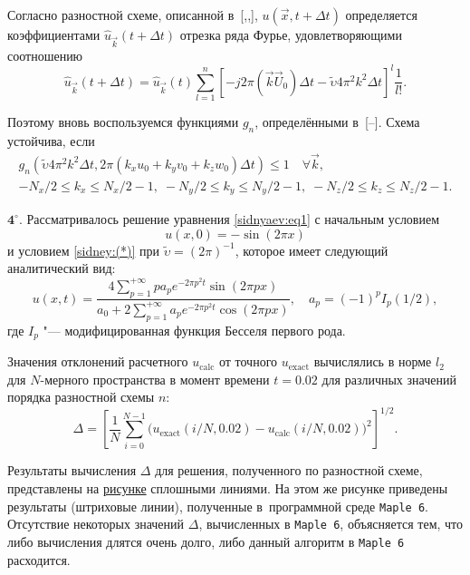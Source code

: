 Согласно разностной схеме, описанной в~[,,], $u ( \vec{x},t+\Delta t)$ определяется коэффициентами
$\hat{u}_{\vec {k}} (t+\Delta t)$ отрезка ряда Фурье, удовлетворяющими соотношению
\[
\hat{u}_{\vec {k}} (t+\Delta t)=\hat{u} _{\vec {k}} ( t )\sum\limits_{l=1}^n \left[-j 2\pi
(\vec {k}\vec {U}_0)\Delta t-  \tilde{\upsilon}  4 \pi^2 k^2\Delta t \right]^l \frac{1}{l!}.
\]

Поэтому вновь воспользуемся функциями $g_n$, определёнными в~[--]. 
Схема устойчива, если 
\begin{gather*}
g_n \left(   \tilde{\upsilon}  4\pi ^2k^2\Delta t, 2\pi (k_x u_0 +k_y v_0
+k_z w_0)\Delta t \right)\le 1 \quad \forall \vec {k},\\
-{N_x }/{2}\le k_x \le {N_x }/{2}-1,\;
-{N_y }/{2}\le k_y \le {N_y }/{2}-1,\;
-{N_z }/{2}\le k_z \le {N_z }/{2}-1.
\end{gather*}

\smallskip

{$\mathbf 4^\circ.$} 
Рассматривалось  решение уравнения \eqref{sidnyaev:eq1} с начальным условием
\begin{equation}
\label{sidnay(***)}
u (x, 0)=-\sin (2\pi x)
\end{equation} 
и условием \eqref{sidney:(*)} при $  \tilde{\upsilon}  = (2 \pi)^{-1}$, которое имеет следующий аналитический вид:
\[
u(x,t)=\frac{4\sum_{p=1}^{+\infty } pa_p e^{-2 \pi p^2 t} \sin (2\pi p x )}
{a_0 +2 \sum _{p=1}^{+\infty} a_p e^{-2 \pi p^2t } \cos (2\pi p x)}, 
\quad
a_p =(-1)^p I_p (1/2),
\]
где
$I_p$ "--- модифицированная функция Бесселя первого рода.

Значения отклонений расчетного $u_{\text{calc}}$ от точного $u_{\text{exact}}
$ вычислялись в норме $l_2$ для $N$-мерного пространства в момент времени
$t=0.02$ для различных значений порядка разностной схемы $n$:
\begin{equation}
\Delta =\left[ \frac{1}{N}\sum\limits_{i=0}^{N-1} \bigl( u_{\text{exact}} ( {i}/{N}, 0.02 )-u_{\text{calc}} (i /N, 0.02 ) \bigr)^2\right]^{1/2}.
\label{sidnay(****)}
\end{equation}

Результаты вычисления $\Delta$ для решения, полученного по разностной схеме, представлены на \hyperlink{sidnay:pic}{рисунке} сплошными линиями. На этом же рисунке  приведены результаты (штриховые линии), полученные в~программной среде {\tt Maple~6}. 
Отсутствие некоторых значений $\Delta $, вычисленных в {\tt Maple~6}, объясняется тем, что либо вычисления длятся очень долго, либо данный алгоритм  в {\tt Maple~6} расходится.




